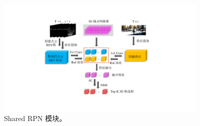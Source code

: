 \begin{figure}
	\centering
	\includegraphics[trim={7cm, 3cm, 8cm, 2cm}, clip,width=0.9\textwidth]{imgs/rpn_final.pdf}
	\caption{Shared RPN 模块。}
	\label{fig:shared_rpn}
\end{figure}
